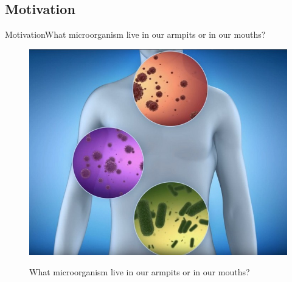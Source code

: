 \documentclass[10pt]{beamer}
\begin{document}
{%
\subsection{Motivation}

\begin{frame}{Motivation}{What microorganism live in our armpits or in our mouths?}
\begin{figure}[]
 \centering
    \includegraphics[width=\textwidth,height=0.7\textheight,keepaspectratio]{img/introduction/mot1.jpg}
    \label{img:mot1}
    \caption{What microorganism live in our armpits or in our mouths?}
\end{figure}
\end{frame}

}
\end{document}
